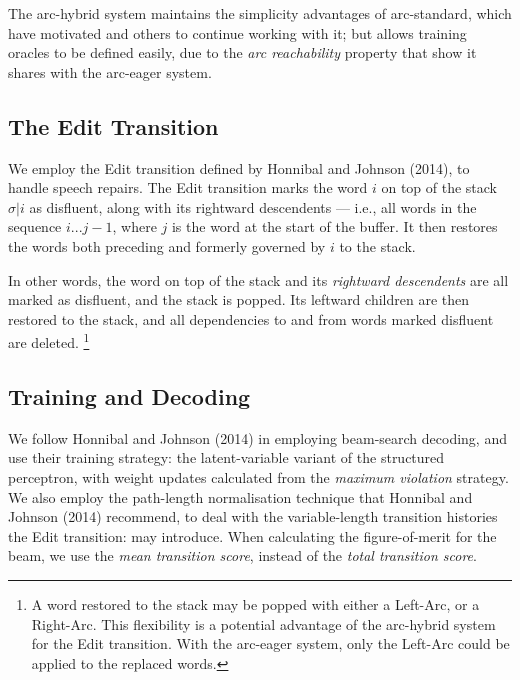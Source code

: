 \documentclass[11pt,letterpaper]{article}
\begin{document}
The arc-hybrid system maintains the simplicity advantages of arc-standard, which
have motivated \citet{huang:10} and others to continue working with it; but allows
training oracles to be defined easily, due to the \emph{arc reachability}
property that \citet{goldberg:13} show it shares with the arc-eager system.

\subsection{The Edit Transition}

We employ the Edit transition defined by Honnibal and Johnson (2014), to handle
speech repairs.
The Edit transition marks the word $i$ on top of the stack $\sigma | i$ as
disfluent, along with its rightward descendents --- i.e., all words in the
sequence $i...j-1$, where $j$ is the word at the start of the buffer. It then
restores the words both preceding and formerly governed by $i$ to the stack.

In other words, the word on top of the stack and its \emph{rightward descendents}
are all marked as disfluent, and the stack is popped. Its leftward children are
then restored to the stack, and all dependencies to and from words marked
disfluent are deleted.
\footnote{A word restored to the stack may be popped with either a Left-Arc, or a Right-Arc.
This flexibility is a potential
    advantage of the arc-hybrid system for the Edit transition. With the
arc-eager system, only the Left-Arc could be applied to the replaced words.}



\subsection{Training and Decoding}
We follow Honnibal and Johnson (2014) in employing beam-search decoding, and
use their training strategy: the \citet{sun:09} latent-variable
variant of the \citet{collins:02} structured perceptron, with weight updates
calculated from the \citet{huang:12} \emph{maximum violation} strategy.  We
also employ the path-length normalisation technique that Honnibal and Johnson (2014)
recommend, to deal with the variable-length transition histories the Edit transition:
may introduce. 
When calculating the figure-of-merit for the beam, we use the
\emph{mean transition score}, instead of the \emph{total transition score}.
\end{document}

